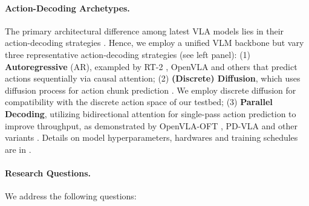 \documentclass{article}
\begin{document}

\paragraph{Action-Decoding Archetypes.} The primary architectural difference among latest VLA models lies in their action-decoding strategies \cite{zhong2025survey}. Hence, we employ a unified VLM backbone but vary three representative action-decoding strategies (see  left panel): (1) \textbf{Autoregressive} (AR), exampled by RT-2 \cite{DBLP:conf/corl/ZitkovichYXXXXW23}, OpenVLA \cite{DBLP:conf/corl/KimPKXB0RFSVKBT24} and others \cite{DBLP:journals/tmlr/ReedZPCNBGSKSEBREHCHVBF22,DBLP:conf/icml/HuangYMLLW0ZJ024,DBLP:conf/icra/ONeillRMGPLPGMJ24} that predict actions sequentially via causal attention; (2) \textbf{(Discrete) Diffusion}, which uses diffusion process for action chunk prediction \cite{pmlr-v305-black25a,bjorck2025gr00t,shukor2025smolvla}. We employ discrete diffusion \cite{liang2025discrete} for compatibility with the discrete action space of our testbed; (3) \textbf{Parallel Decoding}, utilizing bidirectional attention for single-pass action prediction to improve throughput, as demonstrated by OpenVLA-OFT \cite{kim2025fine}, PD-VLA \cite{DBLP:conf/iros/SongCDZZZGLWWML25} and other variants \cite{yin2025deepthinkvla,wang2025bitvla,xiao2025ava}. Details on model hyperparameters, hardwares and training schedules are in .

\paragraph{Research Questions.} We address the following questions:
\end{document}
